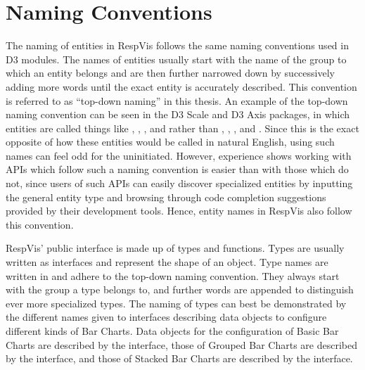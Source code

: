 \section{Naming Conventions}
\label{sec:NamingConventions}

The naming of entities in RespVis follows the same naming conventions
used in D3 modules. The names of entities usually start with the name
of the group to which an entity belongs and are then further narrowed
down by successively adding more words until the exact entity is
accurately described. This convention is referred to as
\enquote{top-down naming} in this thesis. An example of the top-down
naming convention can be seen in the D3 Scale
\parencite{D3Scale} and D3 Axis \parencite{D3Axis} packages, in
which entities are called things like ,
, , and  rather
than , , , and
. Since this is the exact opposite of how these
entities would be called in natural English, using such names
can feel odd for the uninitiated. However, experience shows working
with APIs which follow such a naming convention is easier than with
those which do not, since users of such APIs can easily discover
specialized entities by inputting the general entity type and browsing
through code completion suggestions provided by their development
tools. Hence, entity names in RespVis also follow this convention.

RespVis' public interface is made up of types and functions. Types
are usually written as interfaces and represent the shape of an
object. Type names are written in 
\parencite{PascalCase} and adhere to the top-down naming
convention. They always start with the group a type belongs to, and
further words are appended to distinguish ever more specialized
types. The naming of types can best be demonstrated by the different
names given to interfaces describing data objects to configure
different kinds of Bar Charts. Data objects for the configuration of
Basic Bar Charts are described by the  interface, those
of Grouped Bar Charts are described by the 
interface, and those of Stacked Bar Charts are described by the
 interface.

